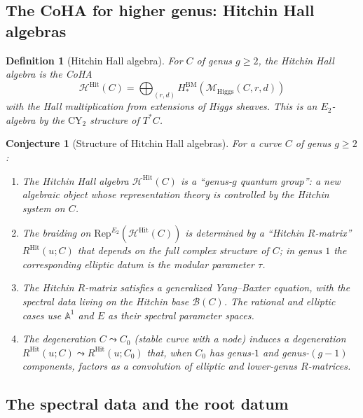 \documentclass[11pt]{article}
\theoremstyle{garamondthm}
\newtheorem{conjecture}[theorem]{Conjecture}
\theoremstyle{garamonddef}
\newtheorem{definition}[theorem]{Definition}
\theoremstyle{garamondrem}
\newcommand{\Rep}{\mathrm{Rep}}
\newcommand{\CY}{\mathrm{CY}}
\newcommand{\Etwo}{E_2}
\newcommand{\cB}{\mathcal{B}}
\newcommand{\cH}{\mathcal{H}}
\newcommand{\cM}{\mathcal{M}}
\newcommand{\Higgs}{\mathrm{Higgs}}
\newcommand{\Hit}{\mathrm{Hit}}
\begin{document}
\subsection{The CoHA for higher genus: Hitchin Hall algebras}
\label{ssec:hitchin-hall}

\begin{definition}[Hitchin Hall algebra]
\label{def:hitchin-hall}
For $C$ of genus $g \geq 2$, the \emph{Hitchin Hall algebra} is the CoHA
\[
 \cH^{\Hit}(C) = \bigoplus_{(r,d)} H^{\mathrm{BM}}_*(\cM_{\Higgs}(C, r, d))
\]
with the Hall multiplication from extensions of Higgs sheaves. This is an $\Etwo$-algebra by the $\CY_2$ structure of $T^*C$.
\end{definition}

\begin{conjecture}[Structure of Hitchin Hall algebras]
\label{conj:hitchin-hall-structure}
For a curve $C$ of genus $g \geq 2$:
\begin{enumerate}[label=(\roman*)]
 \item The Hitchin Hall algebra $\cH^{\Hit}(C)$ is a ``genus-$g$ quantum group'': a new algebraic object whose representation theory is controlled by the Hitchin system on $C$.
 \item The braiding on $\Rep^{\Etwo}(\cH^{\Hit}(C))$ is determined by a ``Hitchin $R$-matrix'' $R^{\Hit}(u; C)$ that depends on the full complex structure of $C$; in genus $1$ the corresponding elliptic datum is the modular parameter $\tau$.
 \item The Hitchin $R$-matrix satisfies a generalized Yang--Baxter equation, with the spectral data living on the Hitchin base $\cB(C)$. The rational and elliptic cases use $\mathbb{A}^1$ and $E$ as their spectral parameter spaces.
 \item The degeneration $C \leadsto C_0$ (stable curve with a node) induces a degeneration $R^{\Hit}(u; C) \leadsto R^{\Hit}(u; C_0)$ that, when $C_0$ has genus-$1$ and genus-$(g-1)$ components, factors as a convolution of elliptic and lower-genus $R$-matrices.
\end{enumerate}
\end{conjecture}

\subsection{The spectral data and the root datum}
\label{ssec:spectral-root-datum}
\end{document}
